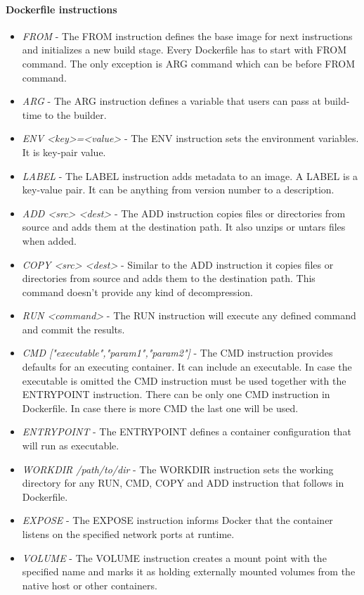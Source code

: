 \documentclass[12pt,a4paper]{article}
\begin{document}
\paragraph{Dockerfile instructions}
\begin{itemize}
\item \textit{FROM} - The FROM instruction defines the base image for next instructions and initializes a new build stage. Every Dockerfile
has to start with FROM command. The only exception is ARG command which can be before FROM command.
\item \textit{ARG} - The ARG instruction defines a variable that users can pass at build-time to the builder.
\item \textit{ENV <key>=<value>} - The ENV instruction sets the environment variables. It is key-pair value. 
\item \textit{LABEL} - The LABEL instruction adds metadata to an image. A LABEL is a key-value pair. It can be anything from version number to a description.
\item \textit{ADD <src> <dest>} - The ADD instruction copies files or directories from source and adds them at the destination path. It also unzips or untars files when added.
\item \textit{COPY <src> <dest>} - Similar to the ADD instruction it copies files or directories from source and adds them to the destination path. This command doesn't provide any kind of decompression.
\item \textit{RUN <command>} - The RUN instruction will execute any defined command and commit the results.
\item \textit{CMD ["executable","param1","param2"]} - The CMD instruction provides defaults for an executing container. It can include an
executable. In case the executable is omitted the CMD instruction must be used together with the ENTRYPOINT instruction. There can be only
one CMD instruction in Dockerfile. In case there is more CMD the last one will be used.
\item \textit{ENTRYPOINT} - The ENTRYPOINT defines a container configuration that will run as executable.
\item \textit{WORKDIR /path/to/dir} - The WORKDIR instruction sets the working directory for any RUN, CMD, COPY and ADD instruction that follows in Dockerfile.
\item \textit{EXPOSE} - The EXPOSE instruction informs Docker that the container listens on the specified network ports at runtime.
\item \textit{VOLUME} - The VOLUME instruction creates a mount point with the specified name and marks it as holding externally mounted volumes from the native host or other containers.
\end{itemize}
\end{document}
